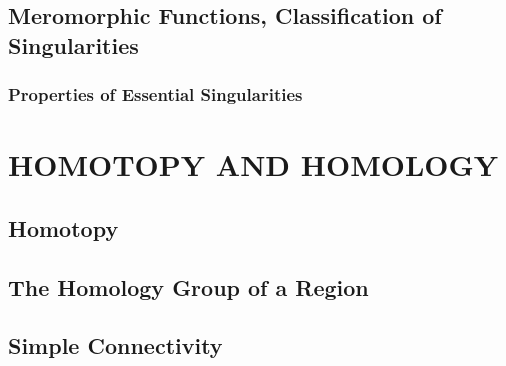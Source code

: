 \documentclass{refbook}
\begin{document}
\subsection{Meromorphic Functions, Classification of Singularities}
\subsubsection{Properties of Essential Singularities}

\section{HOMOTOPY AND HOMOLOGY}
\subsection{Homotopy}
\subsection{The Homology Group of a Region}
\subsection{Simple Connectivity}

\section{}
\end{document}
